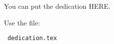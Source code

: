 ﻿%

You can put the dedication HERE.
\par

Use the file: 
\begin{verbatim} dedication.tex
\end{verbatim}
